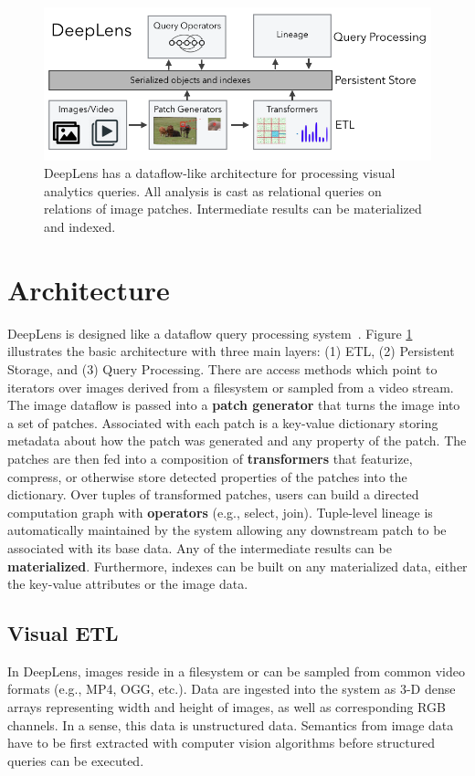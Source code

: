 \begin{figure}[t]
\centering
 \includegraphics[width=\columnwidth]{figures/teaser.png}
 \caption{DeepLens has a dataflow-like architecture for processing visual analytics queries. All analysis is cast as relational queries on relations of image patches. Intermediate results can be materialized and indexed.  \label{teaser} }
\end{figure}

\section{Architecture}
\textsf{DeepLens} is designed like a dataflow query processing system~\cite{graefe1994volcano}.
Figure \ref{teaser} illustrates the basic architecture with three main layers: (1) ETL, (2) Persistent Storage, and (3) Query Processing.
There are access methods which point to iterators over images derived from a filesystem or sampled from a video stream. The image dataflow is passed into a  \textbf{patch generator} that turns the image into a set of patches. Associated with each patch is a key-value dictionary storing metadata about how the patch was generated and any property of the patch. The patches are then fed into a composition of \textbf{transformers} that featurize, compress, or otherwise store detected properties of the patches into the dictionary. Over tuples of transformed patches, users can build a directed computation graph with \textbf{operators} (e.g., select, join).
Tuple-level lineage is automatically maintained by the system allowing any downstream patch to be associated with its base data.
Any of the intermediate results can be \textbf{materialized}. 
Furthermore, indexes can be built on any materialized data, either the key-value attributes or the image data.


\subsection{Visual ETL}
\label{subsection:visualETL}
In \textsf{DeepLens},  images reside in a filesystem or can be sampled from common video formats (e.g., MP4, OGG, etc.). Data are ingested into the system as 3-D dense arrays representing width and height of images, as well as  corresponding RGB channels. In a sense, this data is unstructured data. Semantics from image data have to be first extracted with computer vision algorithms before structured queries can be executed. 

